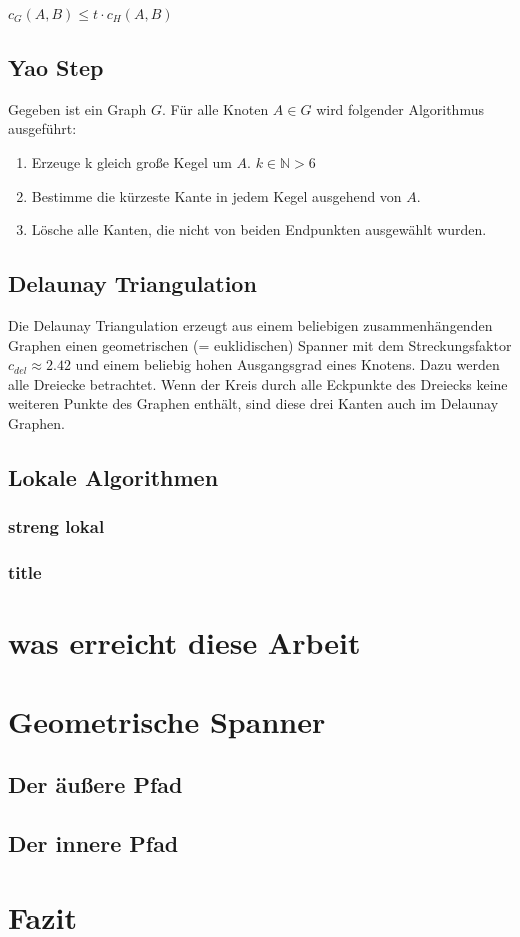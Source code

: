\documentclass[a4paper,twoside]{IEEEtran}
\begin{document}
$c_G(A,B) \leq t \cdot c_H(A,B) $

\subsection{Yao Step}
Gegeben ist ein Graph $G $. Für alle Knoten $A \in G $ wird folgender Algorithmus ausgeführt:
\begin{enumerate}
\item Erzeuge k gleich große Kegel um $A $. $k \in \mathds{N} > 6 $
\item Bestimme die kürzeste Kante in jedem Kegel ausgehend von $A $.
\item Lösche alle Kanten, die nicht von beiden Endpunkten ausgewählt wurden.

\end{enumerate} 

\subsection{Delaunay Triangulation}
Die Delaunay Triangulation erzeugt aus einem beliebigen zusammenhängenden Graphen einen geometrischen (= euklidischen) Spanner mit dem Streckungsfaktor $c_{del} \approx 2.42 $ und einem beliebig hohen Ausgangsgrad eines Knotens. Dazu werden alle Dreiecke betrachtet. Wenn der Kreis durch alle Eckpunkte des Dreiecks keine weiteren Punkte des Graphen enthält, sind diese drei Kanten auch im Delaunay Graphen. 

\subsection{Lokale Algorithmen}
\subsubsection{streng lokal}
\subsubsection{title}


\section{was erreicht diese Arbeit} %

\section{Geometrische Spanner}
\subsection{Der äußere Pfad}
\subsection{Der innere Pfad}


\section{Fazit}




%
\end{document}
